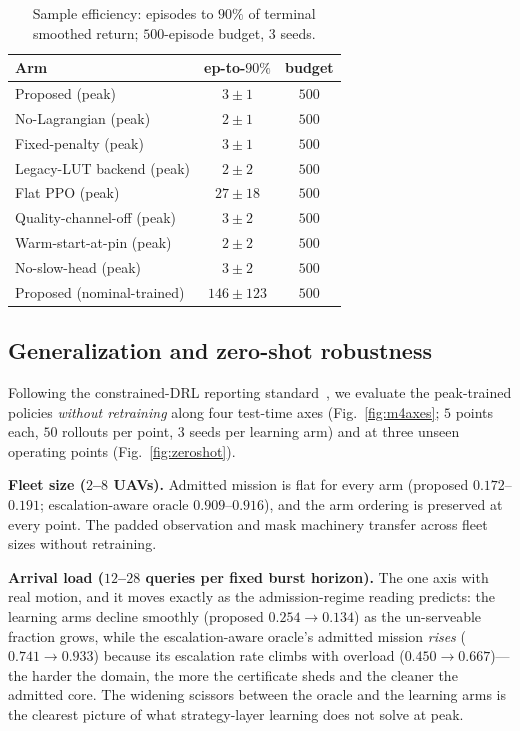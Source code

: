 \begin{table}[t]
\centering
\caption{Sample efficiency: episodes to $90\%$ of terminal smoothed
return; $500$-episode budget, $3$ seeds.}
\label{tab:sampleeff}
\footnotesize
\begin{tabular}{@{}lcc@{}}
\toprule
Arm & ep-to-$90\%$ & budget \\
\midrule
Proposed (peak) & $3\pm1$ & $500$ \\
No-Lagrangian (peak) & $2\pm1$ & $500$ \\
Fixed-penalty (peak) & $3\pm1$ & $500$ \\
Legacy-LUT backend (peak) & $2\pm2$ & $500$ \\
Flat PPO (peak) & $27\pm18$ & $500$ \\
Quality-channel-off (peak) & $3\pm2$ & $500$ \\
Warm-start-at-pin (peak) & $2\pm2$ & $500$ \\
No-slow-head (peak) & $3\pm2$ & $500$ \\
Proposed (nominal-trained) & $146\pm123$ & $500$ \\
\bottomrule
\end{tabular}
\end{table}

\subsection{Generalization and zero-shot robustness}\label{sub:m4}
Following the constrained-DRL reporting
standard~\cite{khairy2021constrained}, we evaluate the peak-trained
policies \emph{without retraining} along four test-time axes
(Fig.~\ref{fig:m4axes}; $5$ points each, $50$ rollouts per point,
$3$ seeds per learning arm) and at three unseen operating points
(Fig.~\ref{fig:zeroshot}).

\textbf{Fleet size ($2$--$8$ UAVs).} Admitted mission is flat for every
arm (proposed $0.172$--$0.191$; escalation-aware oracle
$0.909$--$0.916$), and the arm ordering is preserved at every point. The
padded observation and mask machinery transfer across fleet sizes without
retraining.

\textbf{Arrival load ($12$--$28$ queries per fixed burst horizon).} The
one axis with real motion, and it moves exactly as the admission-regime
reading predicts: the learning arms decline smoothly (proposed
$0.254\to0.134$) as the un-serveable fraction grows, while the
escalation-aware oracle's admitted mission \emph{rises} ($0.741\to0.933$)
because its escalation rate climbs with overload ($0.450\to0.667$)---the
harder the domain, the more the certificate sheds and the cleaner the
admitted core. The widening scissors between the oracle and the learning
arms is the clearest picture of what strategy-layer learning does not
solve at peak.

